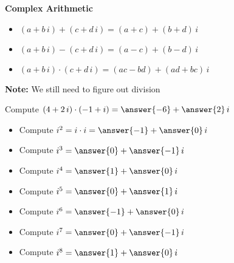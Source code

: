 \documentclass{ximera}
\begin{document}
\begin{definition}  \textbf{\textcolor{green!50!black}{Complex Arithmetic}} \\



\begin{itemize}
\item $ (a + b \, i) + (c + d \, i) = (a+c) + (b+d) \, i$
\item $ (a + b \, i) - (c + d \, i) = (a-c) + (b-d) \, i$
\item $ (a + b \, i) \cdot (c + d \, i) = (ac-bd) + (ad+bc) \, i$
\end{itemize}


\end{definition}









\textbf{Note:} We still need to figure out division






\begin{question}


Compute   $(4 + 2 \, i) \cdot (-1 + i) = \answer{-6} + \answer{2} \, i$

\end{question}





\begin{question}


\begin{itemize}
\item Compute   $i^2 = i \cdot i = \answer{-1} + \answer{0} \, i$
\item Compute   $i^3 =  \answer{0} + \answer{-1} \, i$
\item Compute   $i^4 =  \answer{1} + \answer{0} \, i$
\item Compute   $i^5 =  \answer{0} + \answer{1} \, i$
\item Compute   $i^6 =  \answer{-1} + \answer{0} \, i$
\item Compute   $i^7 =  \answer{0} + \answer{-1} \, i$
\item Compute   $i^8 =  \answer{1} + \answer{0} \, i$
\end{itemize}

\end{question}
\end{document}
